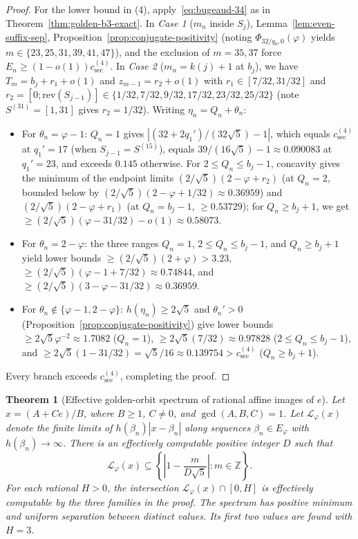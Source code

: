 \documentclass[11pt]{amsart}
\newtheorem{theorem}{Theorem}[section]
\theoremstyle{definition}
\theoremstyle{remark}
\numberwithin{equation}{section}
\newcommand{\Z}{\mathbb{Z}}
\begin{document}
\begin{proof}
For the lower bound in (4), apply~\eqref{eq:bugeaud-34} as in
Theorem~\ref{thm:golden-b3-exact}. In \emph{Case 1} ($m_n$ inside $S_j$),
Lemma~\ref{lem:even-suffix-sep}, Proposition~\ref{prop:conjugate-positivity}
(noting $\Phi_{32/q_0,0}(\varphi)$ yields $m\in\{23,25,31,39,41,47\}$), and
the exclusion of $m=35,37$ force $E_n\ge(1-o(1))c_{\mathrm{sec}}^{(4)}$.
In \emph{Case 2} ($m_n=k(j)+1$ at $b_j$), we have $T_m=b_j+r_1+o(1)$ and
$z_{m-1}=r_2+o(1)$ with $r_1\in[7/32,31/32]$ and
$r_2=[0;\mathrm{rev}(S_{j-1})]\in\{1/32,7/32,9/32,17/32,23/32,25/32\}$
(note $S^{(31)}=[1,31]$ gives $r_2=1/32$). Writing $\eta_n=Q_n+\theta_n$:
\begin{itemize}
\item For $\theta_n=\varphi-1$: $Q_n=1$ gives $|(32+2q_1')/(32\sqrt5)-1|$,
      which equals $c_{\mathrm{sec}}^{(4)}$ at $q_1'=17$ (when $S_{j-1}=S^{(15)}$),
      equals $39/(16\sqrt5)-1\approx0.090083$ at $q_1'=23$, and exceeds $0.145$
      otherwise. For $2\le Q_n\le b_j-1$, concavity gives the minimum of the
      endpoint limits $(2/\sqrt5)(2-\varphi+r_2)$ (at $Q_n=2$, bounded below by
      $(2/\sqrt5)(2-\varphi+1/32)\approx0.36959$) and $(2/\sqrt5)(2-\varphi+r_1)$
      (at $Q_n=b_j-1$, $\ge0.53729$); for $Q_n\ge b_j+1$, we get
      $\ge(2/\sqrt5)(\varphi-31/32)-o(1)\approx0.58073$.
\item For $\theta_n=2-\varphi$: the three ranges $Q_n=1$, $2\le Q_n\le b_j-1$,
      and $Q_n\ge b_j+1$ yield lower bounds $\ge(2/\sqrt5)(2+\varphi)>3.23$,
      $\ge(2/\sqrt5)(\varphi-1+7/32)\approx0.74844$, and
      $\ge(2/\sqrt5)(3-\varphi-31/32)\approx0.36959$.
\item For $\theta_n\notin\{\varphi-1,2-\varphi\}$: $h(\eta_n)\ge2\sqrt5$ and
      $\theta_n'>0$ (Proposition~\ref{prop:conjugate-positivity}) give lower
      bounds $\ge2\sqrt5\varphi^{-2}\approx1.7082$ ($Q_n=1$),
      $\ge2\sqrt5(7/32)\approx0.97828$ ($2\le Q_n\le b_j-1$), and
      $\ge2\sqrt5(1-31/32)=\sqrt5/16\approx0.139754>c_{\mathrm{sec}}^{(4)}$
      ($Q_n\ge b_j+1$).
\end{itemize}
Every branch exceeds $c_{\mathrm{sec}}^{(4)}$, completing the proof.
\end{proof}

\begin{theorem}[Effective golden-orbit spectrum of rational affine images of $e$]
\label{thm:golden-finite-shift}
Let $x=(A+Ce)/B$, where $B\ge1$, $C\ne0$, and $\gcd(A,B,C)=1$.
Let $\mathcal L_\varphi(x)$ denote the finite limits of
$h(\beta_n)|x-\beta_n|$ along sequences $\beta_n\in E_\varphi$ with
$h(\beta_n)\to\infty$. There is an effectively computable positive integer
$D$ such that
\[
 \mathcal L_\varphi(x)\subseteq
 \left\{\left|1-\frac{m}{D\sqrt5}\right|:m\in\Z\right\}.
\]
For each rational $H>0$, the intersection $\mathcal L_\varphi(x)\cap[0,H]$
is effectively computable by the three families in the proof.
The spectrum has positive minimum and uniform separation between
distinct values. Its first two values are found with $H=3$.
\end{theorem}
\end{document}
